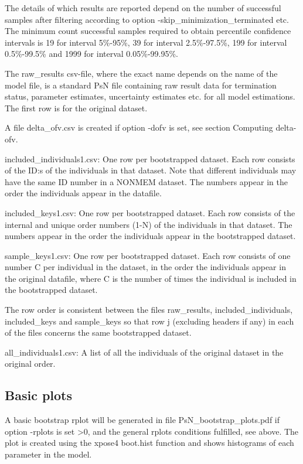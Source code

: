The details of which results are reported depend on the number of successful samples after filtering according to
option -skip\_minimization\_terminated etc. The minimum count successful samples required to obtain
percentile confidence intervals is %
19 for interval 5\%-95\%, 39 for interval 2.5\%-97.5\%, 199 for interval 0.5\%-99.5\% and 1999 for interval 0.05\%-99.95\%.

The raw\_results csv-file, where the exact name depends on the name of the model file, 
is a standard PsN file containing raw result data for termination status, parameter estimates, uncertainty estimates etc. for all model estimations. 
The first row is for the original dataset.

A file delta\_ofv.csv is created if option -dofv is set, see section Computing delta-ofv.

included\_individuals1.csv: One row per bootstrapped dataset. Each row consists of the ID:s of the individuals in that dataset. Note that different individuals may have the same ID number in a NONMEM dataset. The numbers appear in the order the individuals appear in the datafile.

included\_keys1.csv: One row per bootstrapped dataset. Each row consists of the internal and unique order numbers (1-N) of the individuals in that dataset. The numbers appear in the order the individuals appear in the bootstrapped dataset. 

sample\_keys1.csv:  One row per bootstrapped dataset. Each row consists of one number C per individual in the dataset, in the order the individuals appear in the original datafile, where C is the number of times the individual is included in the bootstrapped dataset. 

The row order is consistent between the files raw\_results, included\_individuals, included\_keys and sample\_keys so that row j (excluding headers if any) in each of the files concerns the same bootstrapped dataset.

all\_individuals1.csv: A list of all the individuals of the original dataset in the original order.

\subsection{Basic plots}
A basic bootstrap rplot will be generated in file PsN\_bootstrap\_plots.pdf
if option -rplots is set >0,
and the general rplots conditions fulfilled, see above.
The plot is created using the xpose4 boot.hist function
and shows histograms of each parameter in the model.

